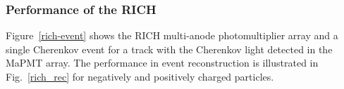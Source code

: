 \documentclass[final,3p,twocolumn]{elsarticle}
\begin{document}


\subsubsection{Performance of the RICH} 

Figure~\ref{rich-event} shows the RICH multi-anode photomultiplier array and a single Cherenkov event for a
track with the Cherenkov light detected in the MaPMT array.  The performance in event reconstruction is
illustrated in Fig.~\ref{rich_rec} for negatively and positively charged particles. 
\end{document}
